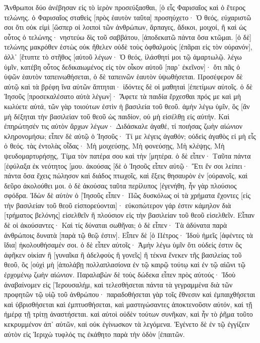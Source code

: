 Ἄνθρωποι δύο ἀνέβησαν εἰς τὸ ἱερὸν προσεύξασθαι, [ὁ εἷς Φαρισαῖος καὶ ὁ ἕτερος τελώνης. 
ὁ Φαρισαῖος σταθεὶς [πρὸς ἑαυτὸν ταῦτα] προσηύχετο· Ὁ θεός, εὐχαριστῶ σοι ὅτι οὐκ εἰμὶ [ὥσπερ οἱ λοιποὶ τῶν ἀνθρώπων, ἅρπαγες, ἄδικοι, μοιχοί, ἢ καὶ ὡς οὗτος ὁ τελώνης· 
νηστεύω δὶς τοῦ σαββάτου, [ἀποδεκατῶ πάντα ὅσα κτῶμαι. 
[ὁ δὲ] τελώνης μακρόθεν ἑστὼς οὐκ ἤθελεν οὐδὲ τοὺς ὀφθαλμοὺς [ἐπᾶραι εἰς τὸν οὐρανόν], ἀλλ᾽ [ἔτυπτε τὸ στῆθος [αὐτοῦ λέγων· Ὁ θεός, ἱλάσθητί μοι τῷ ἁμαρτωλῷ. 
λέγω ὑμῖν, κατέβη οὗτος δεδικαιωμένος εἰς τὸν οἶκον αὐτοῦ [παρ᾽ ἐκεῖνον]· ὅτι πᾶς ὁ ὑψῶν ἑαυτὸν ταπεινωθήσεται, ὁ δὲ ταπεινῶν ἑαυτὸν ὑψωθήσεται. 
Προσέφερον δὲ αὐτῷ καὶ τὰ βρέφη ἵνα αὐτῶν ἅπτηται· ἰδόντες δὲ οἱ μαθηταὶ [ἐπετίμων αὐτοῖς. 
ὁ δὲ Ἰησοῦς [προσεκαλέσατο αὐτὰ λέγων]· Ἄφετε τὰ παιδία ἔρχεσθαι πρός με καὶ μὴ κωλύετε αὐτά, τῶν γὰρ τοιούτων ἐστὶν ἡ βασιλεία τοῦ θεοῦ. 
ἀμὴν λέγω ὑμῖν, ὃς [ἂν μὴ δέξηται τὴν βασιλείαν τοῦ θεοῦ ὡς παιδίον, οὐ μὴ εἰσέλθῃ εἰς αὐτήν. 
Καὶ ἐπηρώτησέν τις αὐτὸν ἄρχων λέγων· Διδάσκαλε ἀγαθέ, τί ποιήσας ζωὴν αἰώνιον κληρονομήσω; 
εἶπεν δὲ αὐτῷ ὁ Ἰησοῦς· Τί με λέγεις ἀγαθόν; οὐδεὶς ἀγαθὸς εἰ μὴ εἷς ὁ θεός. 
τὰς ἐντολὰς οἶδας· Μὴ μοιχεύσῃς, Μὴ φονεύσῃς, Μὴ κλέψῃς, Μὴ ψευδομαρτυρήσῃς, Τίμα τὸν πατέρα σου καὶ τὴν [μητέρα. 
ὁ δὲ εἶπεν· Ταῦτα πάντα [ἐφύλαξα ἐκ νεότητος [μου. 
ἀκούσας [δὲ ὁ Ἰησοῦς εἶπεν αὐτῷ· Ἔτι ἕν σοι λείπει· πάντα ὅσα ἔχεις πώλησον καὶ διάδος πτωχοῖς, καὶ ἕξεις θησαυρὸν ἐν [οὐρανοῖς, καὶ δεῦρο ἀκολούθει μοι. 
ὁ δὲ ἀκούσας ταῦτα περίλυπος [ἐγενήθη, ἦν γὰρ πλούσιος σφόδρα. 
Ἰδὼν δὲ αὐτὸν ὁ [Ἰησοῦς εἶπεν· Πῶς δυσκόλως οἱ τὰ χρήματα ἔχοντες [εἰς τὴν βασιλείαν τοῦ θεοῦ εἰσπορεύονται]· 
εὐκοπώτερον γάρ ἐστιν κάμηλον διὰ [τρήματος βελόνης] εἰσελθεῖν ἢ πλούσιον εἰς τὴν βασιλείαν τοῦ θεοῦ εἰσελθεῖν. 
Εἶπαν δὲ οἱ ἀκούσαντες· Καὶ τίς δύναται σωθῆναι; 
ὁ δὲ εἶπεν· Τὰ ἀδύνατα παρὰ ἀνθρώποις δυνατὰ [παρὰ τῷ θεῷ ἐστιν]. 
Εἶπεν δὲ [ὁ Πέτρος· Ἰδοὺ ἡμεῖς [ἀφέντες τὰ ἴδια] ἠκολουθήσαμέν σοι. 
ὁ δὲ εἶπεν αὐτοῖς· Ἀμὴν λέγω ὑμῖν ὅτι οὐδείς ἐστιν ὃς ἀφῆκεν οἰκίαν ἢ [γυναῖκα ἢ ἀδελφοὺς ἢ γονεῖς] ἢ τέκνα ἕνεκεν τῆς βασιλείας τοῦ θεοῦ, 
ὃς [οὐχὶ μὴ [ἀπολάβῃ πολλαπλασίονα ἐν τῷ καιρῷ τούτῳ καὶ ἐν τῷ αἰῶνι τῷ ἐρχομένῳ ζωὴν αἰώνιον. 
Παραλαβὼν δὲ τοὺς δώδεκα εἶπεν πρὸς αὐτούς· Ἰδοὺ ἀναβαίνομεν εἰς [Ἰερουσαλήμ, καὶ τελεσθήσεται πάντα τὰ γεγραμμένα διὰ τῶν προφητῶν τῷ υἱῷ τοῦ ἀνθρώπου· 
παραδοθήσεται γὰρ τοῖς ἔθνεσιν καὶ ἐμπαιχθήσεται καὶ ὑβρισθήσεται καὶ ἐμπτυσθήσεται, 
καὶ μαστιγώσαντες ἀποκτενοῦσιν αὐτόν, καὶ τῇ ἡμέρᾳ τῇ τρίτῃ ἀναστήσεται. 
καὶ αὐτοὶ οὐδὲν τούτων συνῆκαν, καὶ ἦν τὸ ῥῆμα τοῦτο κεκρυμμένον ἀπ᾽ αὐτῶν, καὶ οὐκ ἐγίνωσκον τὰ λεγόμενα. 
Ἐγένετο δὲ ἐν τῷ ἐγγίζειν αὐτὸν εἰς Ἰεριχὼ τυφλός τις ἐκάθητο παρὰ τὴν ὁδὸν [ἐπαιτῶν. 
